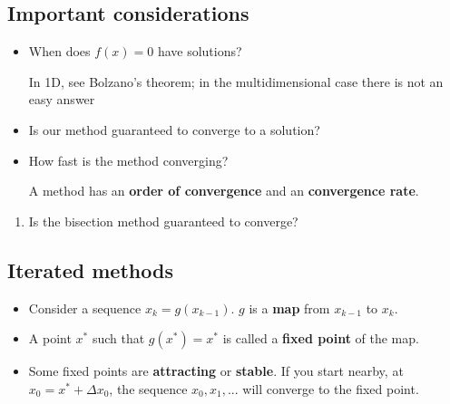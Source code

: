 \documentclass[12pt,letterpaper,noanswers]{exam}
\begin{document}
\subsection*{Important considerations}
\begin{tcolorbox}
\begin{itemize}
\itemsep0pt
    \item When does $f(x) = 0$ have solutions?
    
    In 1D, see Bolzano's theorem; in the multidimensional case there is not an easy answer
    \item Is our method guaranteed to converge to a solution?
    \item How fast is the method converging?
    
    A method has an \textbf{order of convergence} and an \textbf{convergence rate}.
    
\end{itemize}
\end{tcolorbox}



\begin{enumerate}[resume=classQ]
\itemsep0pt
    \item Is the bisection method guaranteed to converge?  
\end{enumerate}

\subsection*{Iterated methods}

\begin{tcolorbox}
\begin{itemize}
\itemsep0pt
    \item Consider a sequence $x_k = g(x_{k-1})$.  $g$ is a \textbf{map} from $x_{k-1}$ to $x_k$.  
    \item A point $x^*$ such that $g(x^*) = x^*$ is called a \textbf{fixed point} of the map.
    \item Some fixed points are \textbf{attracting} or \textbf{stable}.  If you start nearby, at $x_0 = x^* + \Delta x_0$, the sequence $x_0, x_1, ...$ will converge to the fixed point.
\end{itemize}
\end{tcolorbox}
\end{document}

